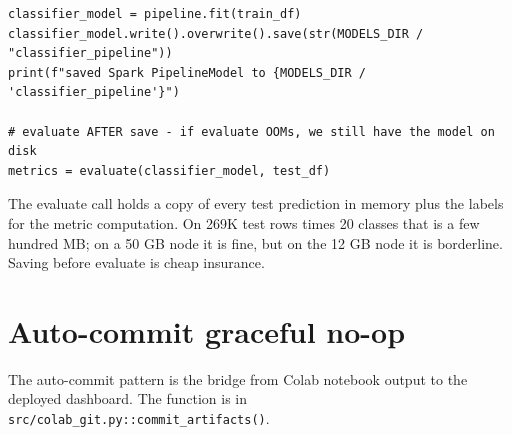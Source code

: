 \documentclass[11pt,letterpaper]{book}
\begin{document}
\begin{lstlisting}
classifier_model = pipeline.fit(train_df)
classifier_model.write().overwrite().save(str(MODELS_DIR / "classifier_pipeline"))
print(f"saved Spark PipelineModel to {MODELS_DIR / 'classifier_pipeline'}")

# evaluate AFTER save - if evaluate OOMs, we still have the model on disk
metrics = evaluate(classifier_model, test_df)
\end{lstlisting}

The evaluate call holds a copy of every test prediction in memory plus the labels for the metric computation. On 269K test rows times 20 classes that is a few hundred MB; on a 50 GB node it is fine, but on the 12 GB node it is borderline. Saving before evaluate is cheap insurance.

\section{Auto-commit graceful no-op}

The auto-commit pattern is the bridge from Colab notebook output to the deployed dashboard. The function is in \texttt{src/colab\_git.py::commit\_artifacts()}.
\end{document}
